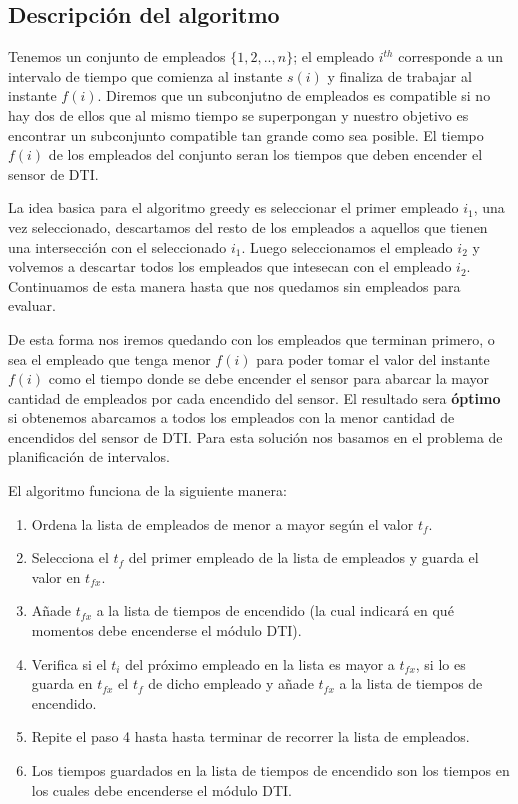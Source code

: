 \documentclass{article}
\begin{document}
\subsection{Descripción del algoritmo}

Tenemos un conjunto de empleados \(\{1,2,..,n\}\); el empleado \(i^{th}\) corresponde a un intervalo de tiempo que comienza al instante \(s(i)\) y finaliza de trabajar al instante \(f(i)\).
Diremos que un subconjutno de empleados es compatible si no hay dos de ellos que al mismo tiempo se superpongan y nuestro objetivo es encontrar un subconjunto compatible tan grande como sea posible.
El tiempo \(f(i)\) de los empleados del conjunto seran los tiempos que deben encender el sensor de DTI.

La idea basica para el algoritmo greedy es seleccionar el primer empleado \(i_1\), una vez seleccionado, descartamos del resto de los empleados a aquellos que tienen una intersección con el seleccionado \(i_1\).
Luego seleccionamos el empleado \(i_2\) y volvemos a descartar todos los empleados que intesecan con el empleado \(i_2\). Continuamos de esta manera hasta que nos quedamos sin empleados para evaluar.  

De esta forma nos iremos quedando con los empleados que terminan primero, o sea el empleado que tenga menor \(f(i)\) para poder tomar el valor del instante \(f(i)\) como el tiempo donde se debe encender el sensor para 
abarcar la mayor cantidad de empleados por cada encendido del sensor. El resultado sera \textbf{óptimo} si obtenemos abarcamos a todos los empleados con la menor cantidad de encendidos del sensor de DTI. Para esta solución nos basamos en el problema de planificación de intervalos.

El algoritmo funciona de la siguiente manera:
\begin{enumerate}
    \item Ordena la lista de empleados de menor a mayor según el valor \(t_f\).
    \item Selecciona el \(t_f\) del primer empleado de la lista de empleados y guarda el valor en \(t_{fx}\).
    \item Añade \(t_{fx}\) a la lista de tiempos de encendido (la cual indicará en qué momentos debe encenderse el módulo DTI).
    \item Verifica si el \(t_i\) del próximo empleado en la lista es mayor a \(t_{fx}\), si lo es guarda en \(t_{fx}\) el \(t_f\) de dicho empleado y añade \(t_{fx}\) a la lista de tiempos de encendido.
    \item Repite el paso 4 hasta hasta terminar de recorrer la lista de empleados.
    \item Los tiempos guardados en la lista de tiempos de encendido son los tiempos en los cuales debe encenderse el módulo DTI.
    
\end{enumerate}
\end{document}
